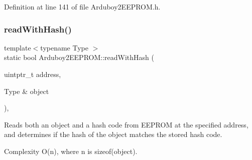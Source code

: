 Definition at line 141 of file Arduboy2\+E\+E\+P\+R\+O\+M.\+h.

\mbox{\label{classArduboy2EEPROM_abbfe69135a48dc52120d209bfba38b7a}} 
\subsubsection{\texorpdfstring{readWithHash()}{readWithHash()}\hspace{0.1cm}{\footnotesize\ttfamily [1/2]}}
{\footnotesize\ttfamily template$<$typename Type $>$ \\
static bool Arduboy2\+E\+E\+P\+R\+O\+M\+::read\+With\+Hash (\begin{DoxyParamCaption}\item[{uintptr\+\_\+t}]{address,  }\item[{Type \&}]{object }\end{DoxyParamCaption})\hspace{0.3cm}{\ttfamily [inline]}, {\ttfamily [static]}}



Reads both an object and a hash code from E\+E\+P\+R\+OM at the specified address, and determines if the hash of the object matches the stored hash code. 

\begin{DoxyParagraph}{Complexity}
{\ttfamily O(n)}, where {\ttfamily n} is {\ttfamily sizeof(object)}.
\end{DoxyParagraph}

